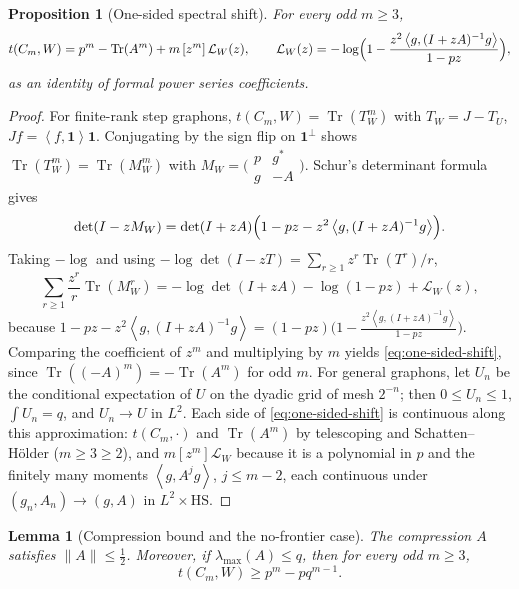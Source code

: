 \documentclass[11pt]{article}
\newtheorem{lemma}[theorem]{Lemma}
\newtheorem{proposition}[theorem]{Proposition}
\newcommand{\one}{\mathbf 1}
\newcommand{\ip}[2]{\left\langle #1,#2\right\rangle}
\newcommand{\Tr}{\operatorname{Tr}}
\newcommand{\cL}{\mathcal L}
\begin{document}
\begin{proposition}[One-sided spectral shift]\label{prop:shift}
For every odd $m\ge3$,
\begin{equation}\label{eq:one-sided-shift}
        t(C_m,W)=p^m-\Tr(A^m)+m\,[z^m]\,\cL_W(z),
        \qquad
        \cL_W(z)=-\log\Bigl(1-\frac{z^2\ip{g}{(I+zA)^{-1}g}}{1-pz}\Bigr),
\end{equation}
as an identity of formal power series coefficients.
\end{proposition}

\begin{proof}
For finite-rank step graphons, $t(C_m,W)=\Tr(T_W^m)$ with $T_W=J-T_U$,
$Jf=\ip f\one\one$.  Conjugating by the sign flip on $\one^\perp$ shows
$\Tr(T_W^m)=\Tr(M_W^m)$ with
$M_W=\bigl(\begin{smallmatrix}p&g^*\\ g&-A\end{smallmatrix}\bigr)$.
Schur's determinant formula gives
\[
        \det(I-zM_W)=\det(I+zA)\Bigl(1-pz-z^2\ip{g}{(I+zA)^{-1}g}\Bigr).
\]
Taking $-\log$ and using $-\log\det(I-zT)=\sum_{r\ge1}z^r\Tr(T^r)/r$,
\[
        \sum_{r\ge1}\frac{z^r}{r}\Tr(M_W^r)
        =-\log\det(I+zA)-\log(1-pz)+\cL_W(z),
\]
because $1-pz-z^2\ip{g}{(I+zA)^{-1}g}
=(1-pz)\bigl(1-\frac{z^2\ip{g}{(I+zA)^{-1}g}}{1-pz}\bigr)$.
Comparing the coefficient of $z^m$ and multiplying by $m$ yields
\eqref{eq:one-sided-shift}, since $\Tr((-A)^m)=-\Tr(A^m)$ for odd $m$.
For general graphons, let $U_n$ be the conditional expectation of $U$ on the
dyadic grid of mesh $2^{-n}$; then $0\le U_n\le1$, $\int U_n=q$, and $U_n\to U$
in $L^2$.  Each side of \eqref{eq:one-sided-shift} is continuous along this
approximation: $t(C_m,\cdot)$ and $\Tr(A^m)$ by telescoping and
Schatten--H\"older ($m\ge3\ge2$), and $m[z^m]\cL_W$ because it is a polynomial
in $p$ and the finitely many moments $\ip g{A^jg}$, $j\le m-2$, each continuous
under $(g_n,A_n)\to(g,A)$ in $L^2\times\mathrm{HS}$.
\end{proof}

\begin{lemma}[Compression bound and the no-frontier case]\label{lem:no-frontier}
The compression $A$ satisfies $\|A\|\le\tfrac12$.  Moreover, if
$\lambda_{\max}(A)\le q$, then for every odd $m\ge3$,
\[
        t(C_m,W)\ge p^m-pq^{m-1}.
\]
\end{lemma}
\end{document}
